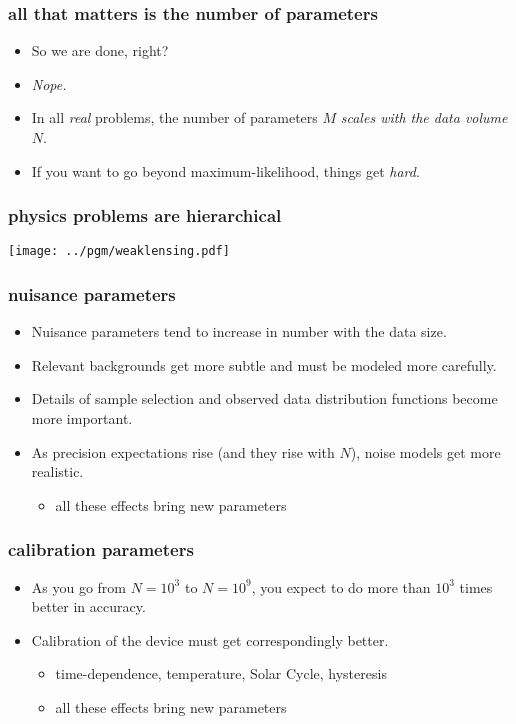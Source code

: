 \documentclass[pdftex]{beamer}
\begin{document}
\begin{frame}
  \frametitle{all that matters is the number of parameters}
  \begin{itemize}
  \item So we are done, right?
  \item<2-> \emph{Nope.}
  \item<3-> In all \emph{real} problems, the number of parameters $M$ \emph{scales with the data volume $N$}.
  \item<3-> If you want to go beyond maximum-likelihood, things get \emph{hard}.
  \end{itemize}
\end{frame}

\begin{frame}
  \frametitle{physics problems are hierarchical}
  \texttt{[image: ../pgm/weaklensing.pdf]}
\end{frame}

\begin{frame}
  \frametitle{nuisance parameters}
  \begin{itemize}
  \item Nuisance parameters tend to increase in number with the data size.
  \item Relevant backgrounds get more subtle and must be modeled more carefully.
  \item Details of sample selection and observed data distribution functions become more important.
  \item As precision expectations rise (and they rise with $N$), noise models get more realistic.
    \begin{itemize}
    \item all these effects bring new parameters
    \end{itemize}
  \end{itemize}
\end{frame}

\begin{frame}
  \frametitle{calibration parameters}
  \begin{itemize}
  \item As you go from $N=10^3$ to $N=10^9$, you expect to do more than $10^3$ times better in accuracy.
  \item Calibration of the device must get correspondingly better.
    \begin{itemize}
    \item time-dependence, temperature, Solar Cycle, hysteresis
    \item all these effects bring new parameters
    \end{itemize}
  \end{itemize}
\end{frame}
\end{document}

